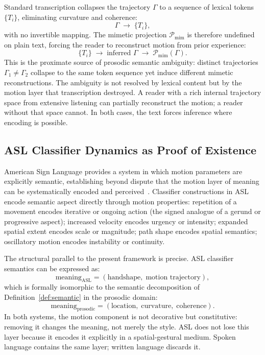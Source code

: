 \documentclass[12pt, a4paper]{article}
\begin{document}
Standard transcription collapses the trajectory $\Gamma$ to a sequence of lexical tokens $\{T_i\}$, eliminating curvature and coherence:
\begin{equation}
\Gamma \;\longrightarrow\; \{T_i\},
\label{eq:collapse}
\end{equation}
with no invertible mapping. The mimetic projection $\mathcal{P}_{\mathrm{mim}}$ is therefore undefined on plain text, forcing the reader to reconstruct motion from prior experience:
\begin{equation}
\{T_i\} \;\to\; \text{inferred } \Gamma \;\to\; \mathcal{P}_{\mathrm{mim}}(\Gamma).
\label{eq:inference}
\end{equation}
This is the proximate source of prosodic semantic ambiguity: distinct trajectories $\Gamma_1 \neq \Gamma_2$ collapse to the same token sequence yet induce different mimetic reconstructions. The ambiguity is not resolved by lexical content but by the motion layer that transcription destroyed. A reader with a rich internal trajectory space from extensive listening can partially reconstruct the motion; a reader without that space cannot. In both cases, the text forces inference where encoding is possible.

\subsection{ASL Classifier Dynamics as Proof of Existence}

American Sign Language provides a system in which motion parameters are explicitly semantic, establishing beyond dispute that the motion layer of meaning can be systematically encoded and perceived~\cite{Liddell2003,Emmorey2002}. Classifier constructions in ASL encode semantic aspect directly through motion properties: repetition of a movement encodes iterative or ongoing action (the signed analogue of a gerund or progressive aspect); increased velocity encodes urgency or intensity; expanded spatial extent encodes scale or magnitude; path shape encodes spatial semantics; oscillatory motion encodes instability or continuity.

The structural parallel to the present framework is precise. ASL classifier semantics can be expressed as:
\begin{equation}
\text{meaning}_{\mathrm{ASL}} = (\text{handshape},\; \text{motion trajectory}),
\label{eq:asl}
\end{equation}
which is formally isomorphic to the semantic decomposition of Definition~\ref{def:semantic} in the prosodic domain:
\begin{equation}
\text{meaning}_{\mathrm{prosodic}} = (\text{location},\; \text{curvature},\; \text{coherence}).
\label{eq:prosodic_meaning}
\end{equation}
In both systems, the motion component is not decorative but constitutive: removing it changes the meaning, not merely the style. ASL does not lose this layer because it encodes it explicitly in a spatial-gestural medium. Spoken language contains the same layer; written language discards it.
\end{document}
